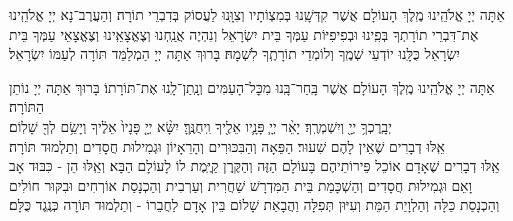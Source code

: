 \documentclass[twoside, openany, parskip=half, 11pt]{book}
\begin{document}
אַתָּה יְיָ אֱלֹהֵֽינוּ מֶֽלֶךְ הָעוֹלָם אֲשֶׁר קִדְּשָֽׁנוּ בְּמִצְוֹתָיו וְצִוָּֽנוּ לַעֲסוֹק בְּדִבְרֵי תוֹרָה׃ וְהַעֲרֶב־נָא יְיָ אֱלֹהֵֽינוּ אֶת־דִּבְרֵי תוֹרָתְךָ בְּפִֽינוּ וּבְפִיפִיּוֹת עַמְּךָ בֵּית יִשְׂרָאֵל וְנִהְיֶה אֲנַֽחְנוּ וְצֶאֱצָאֵֽינוּ וְצֶאֱצָאֵי עַמְּךָ בֵּית יִשְׂרָאֵל כֻּלָּֽנוּ יוֹדְעֵי שְׁמֶֽךָ וְלוֹמְדֵי תוֹרָתֶֽךָ לִשְׁמָהּ׃ בָּרוּךְ אַתָּה יְיָ הַמְלַמֵּד תּוֹרָה לְעַמּוֹ יִשְׂרָאֵל׃

אַתָּה יְיָ אֱלֹהֵֽינוּ מֶֽלֶךְ הָעוֹלָם אֲשֶׁר בָּֽחַר־בָּֽנוּ מִכׇּל־הָעַמִּים וְנָֽתַן־לָֽנוּ אֶת־תּוֹרָתוֹ׃ בָּרוּךְ אַתָּה יְיָ נוֹתֵן הַתּוֹרָה׃\\
יְבָֽרֶכְךָ֥ יְיָ֖ וְיִשְׁמְרֶֽךָ׃ יָאֵ֨ר יְיָ֧ פָּנָ֛יו אֵלֶ֖יךָ וִֽיחֻנֶּֽךָּ׃ יִשָּׂ֨א יְיָ֤ פָּנָיו֙ אֵלֶ֔יךָ וְיָשֵׂ֥ם לְךָ֖ שָׁלֽוֹם׃\\
אֵֽלּוּ דְבָרִים שֶׁאֵין לָהֶם שִׁעוּר׃ הַפֵּאָה וְהַבִּכּוּרִים וְהָרֵאָיוֹן וּגְמִילוּת חֲסָדִים וְתַלְמוּד תּוֹרָה׃\\
אֵֽלּוּ דְבָרִים שֶׁאָדָם אוֹכֵל פֵּירוֹתֵיהֶם בָּעוֹלָם הַזֶּה וְהַקֶּֽרֶן קַיֶּֽמֶת לוֹ לָעוֹלָם הַבָּא׃ וְאֵֽלּוּ הֵן - כִּבּוּד אָב וָאֵם וּגְמִילוּת חֲסָדִים וְהַשְׁכָּמַת בֵּית הַמִּדְרָשׁ שַׁחֲרִית וְעַרְבִית וְהַכְנָסַת אוֹרְחִים וּבִקּוּר חוֹלִים וְהַכְנָסַת כַּלָּה וְהַלְוָיַת הַמֵּת וְעִיּוּן תְּפִלָּה וַהֲבָאַת שָׁלוֹם בֵּין אָדָם לַחֲבֵרוֹ - וְתַלְמוּד תּוֹרָה כְּנֶֽגֶד כֻּלָּם׃




\newcommand{\adonolam}{

\firstword{אֲדוֹן עוֹלָם}
אֲשֶׁר מָלַךְ \hfill בְּטֶֽרֶם כׇּל־יְצִיר נִבְרָא׃ \\
לְעֵת נַעֲשָׂה בְחֶפְצוֹ כֹּל \hfill אֲזַי מֶֽלֶךְ שְׁמוֹ נִקְרָא׃\\
וְאַֽחֲרֵי כִּכְלוֹת הַכֹּל \hfill לְבַדּוֹ יִמְלֹךְ נוֹרָא׃ \\
וְהוּא הָיָה וְהוּא הוֶֹה \hfill וְהוּא יִהְיֶה בְּתִפְאָרָה׃ \\
וְהוּא אֶחָד וְאֵין שֵׁנִי \hfill לְהַמְשִׁיל לוֹ לְהַחְבִּֽירָה׃ \\
בְּלִי רֵאשִׁית בְּלִי תַכְלִית \hfill וְלוֹ הָעֹז וְהַמִּשְׂרָה׃ \\
וְהוּא אֵלִי וְחַי גוֹאֲלִי \hfill וְצוּר חֶבְלִי בְּעֵת צָרָה׃ \\
וְהוּא נִסִּי וּמָנוֹסִי \hfill מְנָת כּוֹסִי בְּיוֹם אֶקְרָא׃ \\
בְּיָדוֹ אַפְקִיד רוּחִי \hfill בְּעֵת אִישַׁן וְאָעִֽירָה׃ \\
וְעִם רוּחִי גְּוִיָּתִי \hfill אֲדוֹנָי לִי וְלֹא אִירָא׃
}
\end{document}
